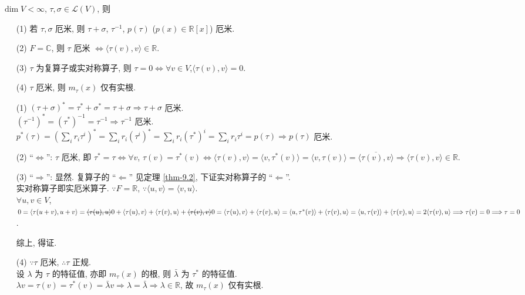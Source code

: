 \documentclass{note}
\begin{document}
\begin{thm}
    $\dim V<\infty$, $\tau,\sigma\in\mathcal{L}(V)$, 则
    \begin{itemize}
        \item[(1)] 若 $\tau,\sigma$ 厄米, 则 $\tau+\sigma$, $\tau^{-1}$, $p(\tau)$ ($p(x)\in\mathbb{R}[x]$) 厄米.
        \item[(2)] $F=\mathbb{C}$, 则 $\tau$ 厄米 $\Longleftrightarrow\langle\tau(v),v\rangle\in\mathbb{R}$.
        \item[(3)] $\tau$ 为复算子或实对称算子, 则 $\tau=0\Longleftrightarrow\forall v\in V$,$\langle\tau(v),v\rangle=0$.
        \item[(4)] $\tau$ 厄米, 则 $m_{\tau}(x)$ 仅有实根.
    \end{itemize}
\end{thm}
\begin{pf}
    \begin{itemize}
        \item[(1)] $(\tau+\sigma)^*=\tau^*+\sigma^*=\tau+\sigma\Longrightarrow\tau+\sigma$ 厄米.\\
        $(\tau^{-1})^*=(\tau^*)^{-1}=\tau^{-1}\Longrightarrow\tau^{-1}$ 厄米.\\
        $p^*(\tau)=\left(\sum_ir_i\tau^i\right)^*=\sum_ir_i(\tau^i)^*=\sum_ir_i(\tau^*)^i=\sum_ir_i\tau^i=p(\tau)\Longrightarrow p(\tau)$ 厄米.
        \item[(2)] ``$\Longleftrightarrow$'': $\tau$ 厄米, 即 $\tau^*=\tau\Longleftrightarrow\forall v$, $\tau(v)=\tau^*(v)\Longleftrightarrow\langle\tau(v),v\rangle=\langle v,\tau^*(v)\rangle=\langle v,\tau(v)\rangle=\overline{\langle\tau(v),v\rangle}\Longrightarrow\langle\tau(v),v\rangle\in\mathbb{R}$.
        \item[(3)] ``$\Longrightarrow$'': 显然. 复算子的 ``$\Longleftarrow$'' 见定理 \ref{thm-9.2}, 下证实对称算子的 ``$\Longleftarrow$''.\\
        实对称算子即实厄米算子. $\because F=\mathbb{R}$, $\because\langle u,v\rangle=\langle v,u\rangle$.\\
        $\forall u,v\in V$, $0=\langle\tau(u+v),u+v\rangle=\msout{\langle\tau(u),u\rangle}0+\langle\tau(u),v\rangle+\langle\tau(v),u\rangle+\msout{\langle\tau(v),v\rangle}0=\langle\tau(u),v\rangle+\langle\tau(v),u\rangle=\langle u,\tau^*(v)\rangle+\langle\tau(v),u\rangle=\langle u,\tau(v)\rangle+\langle\tau(v),u\rangle=2\langle\tau(v),u\rangle\Longrightarrow\tau(v)=0\Longrightarrow\tau=0$.

        综上, 得证.
        \item[(4)] $\because\tau$ 厄米, $\therefore\tau$ 正规.\\
        设 $\lambda$ 为 $\tau$ 的特征值, 亦即 $m_{\tau}(x)$ 的根, 则 $\bar{\lambda}$ 为 $\tau^*$ 的特征值.\\
        $\lambda v=\tau(v)=\tau^*(v)=\bar{\lambda}v\Longrightarrow\lambda=\bar{\lambda}\Longrightarrow\lambda\in\mathbb{R}$, 故 $m_{\tau}(x)$ 仅有实根.
    \end{itemize}
\end{pf}
\end{document}

